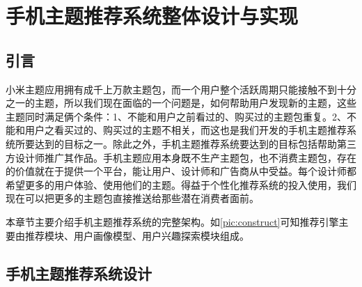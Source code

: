 
\chapter{手机主题推荐系统整体设计与实现}
    \section{引言}
    小米主题应用拥有成千上万款主题包，而一个用户整个活跃周期只能接触不到十分之一的主题，所以我们现在面临的一个问题是，如何帮助用户发现新的主题，这些主题同时满足俩个条件：1、不能和用户之前看过的、购买过的主题包重复。2、不能和用户之看买过的、购买过的主题不相关，而这也是我们开发的手机主题推荐系统所要达到的目标之一。除此之外，手机主题推荐系统要达到的目标包括帮助第三方设计师推广其作品。手机主题应用本身既不生产主题包，也不消费主题包，存在的价值就在于提供一个平台，能让用户、设计师和广告商从中受益。每个设计师都希望更多的用户体验、使用他们的主题。得益于个性化推荐系统的投入使用，我们现在可以把更多的主题包直接推送给那些潜在消费者面前。

    本章节主要介绍手机主题推荐系统的完整架构。如\autoref{pic:construct}可知推荐引擎主要由推荐模块、用户画像模型、用户兴趣探索模块组成。
    \section{手机主题推荐系统设计}
    
    \begin{figure}
      \centering
        \label{pic:construct}
    \end{figure}

